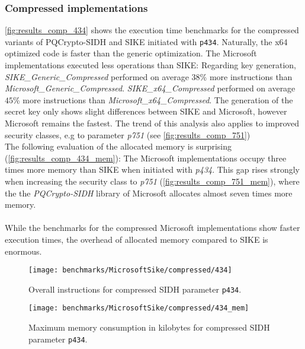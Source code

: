 \subsubsection{Compressed implementations}
\autoref{fig:results_comp_434} shows the execution time benchmarks for the compressed variants of \gls{PQCrypto-SIDH} and \gls{SIKE} initiated with \texttt{p434}. Naturally, the x64 optimized code is faster than the generic optimization. The Microsoft implementations executed less operations than \gls{SIKE}: Regarding key generation, \textit{SIKE\_Generic\_Compressed} performed on average $38$\% more instructions than \textit{Microsoft\_Generic\_Compressed}. \textit{SIKE\_x64\_Compressed} performed on average $45$\% more instructions than \textit{Microsoft\_x64\_Compressed}. The generation of the secret key only shows slight differences between \gls{SIKE} and Microsoft, however Microsoft remains the fastest. The trend of this analysis also applies to improved security classes, e.g to parameter \textit{p751} (see \autoref{fig:results_comp_751})
\\
The following evaluation of the allocated memory is surprising (\autoref{fig:results_comp_434_mem}): The Microsoft implementations occupy three times more memory than \gls{SIKE} when initiated with \textit{p434}. This gap rises strongly when increasing the security class to \textit{p751} (\autoref{fig:results_comp_751_mem}), where the the \textit{ \gls{PQCrypto-SIDH}} library of Microsoft allocates almost seven times more memory.
\\\\
While the benchmarks for the compressed Microsoft implementations show faster execution times, the overhead of allocated memory compared to \gls{SIKE} is enormous.

\begin{figure}[H]
  \centering
  \texttt{[image: benchmarks/MicrosoftSike/compressed/434]}
  \caption[Overall instructions compressed p434]
  {Overall instructions for compressed \gls{SIDH} parameter \texttt{p434}.}
  \label{fig:results_comp_434}
\end{figure}

\begin{figure}[H]
  \centering
  \texttt{[image: benchmarks/MicrosoftSike/compressed/434\_mem]}
  \caption[Maximum memory consumption compressed p434]
  {Maximum memory consumption in kilobytes for compressed \gls{SIDH} parameter \texttt{p434}.}
  \label{fig:results_comp_434_mem}
\end{figure}

